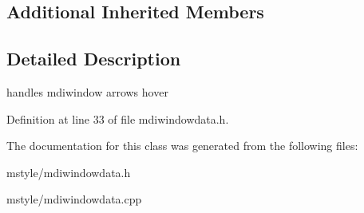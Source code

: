 \subsection*{Additional Inherited Members}


\subsection{Detailed Description}
handles mdiwindow arrows hover 

Definition at line 33 of file mdiwindowdata.\+h.



The documentation for this class was generated from the following files\+:\begin{DoxyCompactItemize}
\item 
mstyle/mdiwindowdata.\+h\item 
mstyle/mdiwindowdata.\+cpp\end{DoxyCompactItemize}

